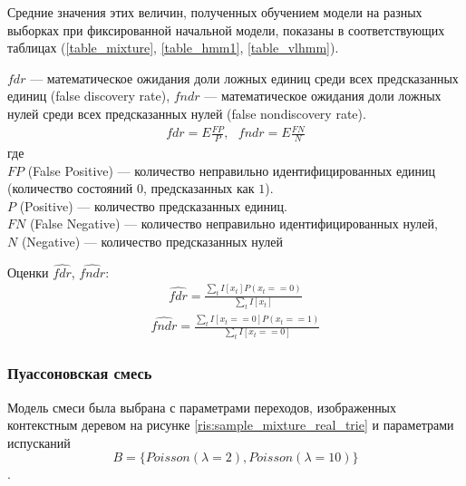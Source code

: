\documentclass{matmex-diploma-custom}
\begin{document}
Средние значения этих величин, полученных обучением модели на разных выборках при фиксированной начальной модели, показаны в соответствующих таблицах (\ref{table_mixture}, \ref{table_hmm1}, \ref{table_vlhmm}).

$\textit{fdr}$ --- математическое ожидания доли ложных единиц среди всех предсказанных единиц (false discovery rate),
$\textit{fndr}$ --- математическое ожидания доли ложных нулей среди всех предсказанных нулей  (false nondiscovery rate).
\begin{align*}
\textit{fdr} = E\frac{\textit{FP}}{P}, 
~~~\textit{fndr} = E\frac{\textit{FN}}{N}
\end{align*}
где 
\\$FP$ (False Positive) --- количество неправильно идентифицированных единиц (количество состояний $0$, предсказанных как $1$).
\\$P$ (Positive) --- количество предсказанных единиц.
\\$FN$ (False Negative) --- количество неправильно идентифицированных нулей,
\\$N$ (Negative) --- количество предсказанных нулей 

Оценки $\hat{\textit{fdr}}$, $\hat{\textit{fndr}}$:
\begin{align}
\hat{\textit{fdr}} = \frac{\sum_{t}{I[x_t]P(x_t==0)}}{\sum_{t}{I[x_t]}}
\label{formula:est_fdr}
\end{align}
\begin{align}
\hat{\textit{fndr}} = \frac{\sum_{t}{I[x_t==0]P(x_t==1)}}{\sum_{t}{I[x_t==0]}}
\label{formula:est_fndr}
\end{align}

\subsubsection{Пуассоновская смесь}
Модель смеси была выбрана с параметрами переходов, изображенных контекстным деревом на рисунке \ref{ris:sample_mixture_real_trie} и параметрами испусканий
$$B = \{\textit{Poisson}(\lambda=2), \textit{Poisson}(\lambda=10)\}$$.
\end{document}
